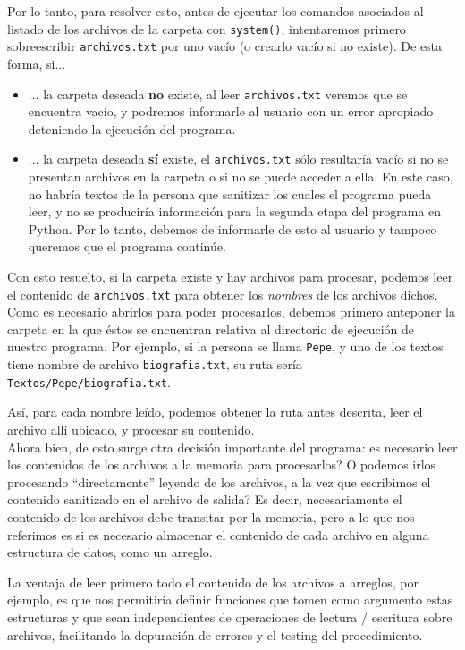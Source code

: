 \documentclass[a4paper]{article}
\begin{document}
Por lo tanto, para resolver esto, antes de ejecutar los comandos asociados al listado de los archivos de la carpeta con \texttt{system()}, intentaremos primero sobreescribir \texttt{archivos.txt} por uno vacío (o crearlo vacío si no existe). De esta forma, si...

\begin{itemize}
    \item ... la carpeta deseada \textbf{no} existe, al leer \texttt{archivos.txt} veremos que se encuentra vacío, y podremos informarle al usuario con un error apropiado deteniendo la ejecución del programa.
    \item ... la carpeta deseada \textbf{sí} existe, el \texttt{archivos.txt} sólo resultaría vacío si no se presentan archivos en la carpeta o si no se puede acceder a ella. En este caso, no habría textos de la persona que sanitizar los cuales el programa pueda leer, y no se produciría información para la segunda etapa del programa en Python. Por lo tanto, debemos de informarle de esto al usuario y tampoco queremos que el programa continúe.
\end{itemize}

Con esto resuelto, si la carpeta existe y hay archivos para procesar, podemos leer el contenido de \texttt{archivos.txt} para obtener los \textit{nombres} de los archivos dichos. Como es necesario abrirlos para poder procesarlos, debemos primero anteponer la carpeta en la que éstos se encuentran relativa al directorio de ejecución de nuestro programa. Por ejemplo, si la persona se llama \texttt{Pepe}, y uno de los textos tiene nombre de archivo \texttt{biografia.txt}, su ruta sería \texttt{Textos/Pepe/biografia.txt}.

Así, para cada nombre leído, podemos obtener la ruta antes descrita, leer el archivo allí ubicado, y procesar su contenido. \\

Ahora bien, de esto surge otra decisión importante del programa: es necesario leer los contenidos de los archivos a la memoria para procesarlos? O podemos irlos procesando ``directamente'' leyendo de los archivos, a la vez que escribimos el contenido sanitizado en el archivo de salida?
Es decir, necesariamente el contenido de los archivos debe transitar por la memoria, pero a lo que nos referimos es si es necesario almacenar el contenido de cada archivo en alguna estructura de datos, como un arreglo.

La ventaja de leer primero todo el contenido de los archivos a arreglos, por ejemplo, es que nos permitiría definir funciones que tomen como argumento estas estructuras y que sean independientes de operaciones de lectura / escritura sobre archivos, facilitando la depuración de errores y el testing del procedimiento.
\end{document}
